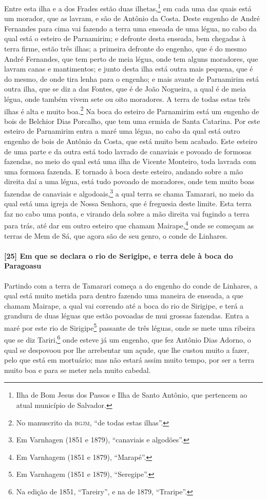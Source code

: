 Entre esta ilha e a dos Frades estão duas ilhetas,\footnote{ Ilha de Bom Jesus dos Passos
e Ilha de Santo Antônio, que pertencem ao atual município de Salvador.} em cada uma das
quais está um morador, que as lavram, e são de Antônio da Costa. Deste engenho de André
Fernandes para cima vai fazendo a terra uma enseada de uma légua, no cabo da qual está o
esteiro de Parnamirim; e defronte desta enseada, bem chegadas à terra firme, estão três
ilhas; a primeira defronte do engenho, que é do mesmo André Fernandes, que tem perto de
meia légua, onde tem alguns moradores, que lavram canas e mantimentos; e junto desta ilha
está outra mais pequena, que é do mesmo, de onde tira lenha para o engenho; e mais avante
de Parnamirim está outra ilha, que se diz a das Fontes, que é de João Nogueira, a qual é
de meia légua, onde também vivem sete ou oito moradores. A terra de todas estas três ilhas
é alta e muito boa.\footnote{ No manuscrito da \textsc{bgjm}, ``de todas estas ilhas''.}
Na boca do esteiro de Parnamirim está um engenho de bois de Belchior Dias Porcalho, que
tem uma ermida de Santa Catarina. Por este esteiro de Parnamirim entra a maré uma légua,
no cabo da qual está outro engenho de bois de Antônio da Costa, que está muito bem
acabado. Este esteiro de uma parte e da outra está todo lavrado de canaviais e povoado de
formosas fazendas, no meio do qual está uma ilha de Vicente Monteiro, toda lavrada com uma
formosa fazenda. E tornado à boca deste esteiro, andando sobre a mão direita daí a uma
légua, está tudo povoado de moradores, onde tem muito boas fazendas de canaviais e
algodoais,\footnote{ Em Varnhagen (1851 e 1879), ``canaviais e algodões''.} a qual terra
se chama Tamarari, no meio da qual está uma igreja de Nossa Senhora, que é freguesia deste
limite. Esta terra faz no cabo uma ponta, e virando dela sobre a mão direita vai fugindo a
terra para trás, até dar em outro esteiro que chamam Mairape,\footnote{ Em Varnhagem (1851
e 1879), ``Marapé''.} onde se começam as terras de Mem de Sá, que agora são de seu genro,
o conde de Linhares.

\paragraph{[25] Em que se declara o rio de Serigipe, e terra dele à boca do Paragoasu}\quad
Partindo com a terra de Tamarari começa a do engenho do conde de Linhares, a qual está
muito metida para dentro fazendo uma maneira de enseada, a que chamam Mairape, a qual vai
correndo até a boca do rio de Sirigipe, e terá a grandura de duas léguas que estão
povoadas de mui grossas fazendas. Entra a maré por este rio de Sirigipe\footnote{ Em
Varnhagem (1851 e 1879), ``Seregipe''.} passante de três léguas, onde se mete uma ribeira
que se diz Tariri,\footnote{ Na edição de 1851, ``Tareiry'', e na de 1879, ``Traripe''.}
onde esteve já um engenho, que fez Antônio Dias Adorno, o qual se despovoou por lhe
arrebentar um açude, que lhe custou muito a fazer, pelo que está em mortuário;
mas não estará assim muito tempo, por ser a terra muito boa e
para se meter nela muito cabedal.

